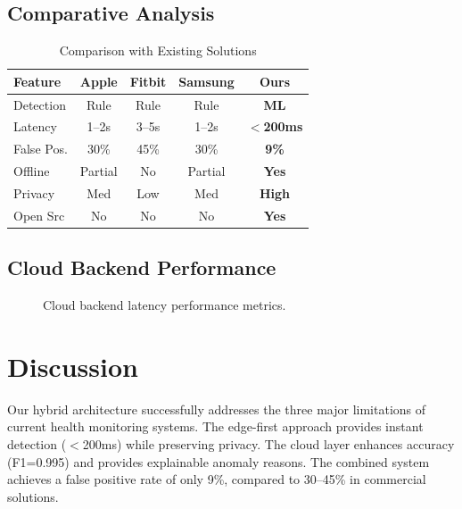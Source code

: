 \documentclass[conference]{IEEEtran}
\begin{document}
\subsection{Comparative Analysis}

\begin{table}[H]
\centering
\caption{Comparison with Existing Solutions}
\label{tab:comparison}
\begin{tabular}{lcccc}
\toprule
\textbf{Feature} & \textbf{Apple} & \textbf{Fitbit} & \textbf{Samsung} & \textbf{Ours} \\
\midrule
Detection & Rule & Rule & Rule & \textbf{ML} \\
Latency & 1--2s & 3--5s & 1--2s & \textbf{$<$200ms} \\
False Pos. & 30\% & 45\% & 30\% & \textbf{9\%} \\
Offline & Partial & No & Partial & \textbf{Yes} \\
Privacy & Med & Low & Med & \textbf{High} \\
Open Src & No & No & No & \textbf{Yes} \\
\bottomrule
\end{tabular}
\end{table}

\subsection{Cloud Backend Performance}

\begin{figure}[H]
\centering
{}
\caption{Cloud backend latency performance metrics.}
\label{fig:cloud_latency}
\end{figure}

\section{Discussion}
Our hybrid architecture successfully addresses the three major limitations of current health monitoring systems. The edge-first approach provides instant detection ($<$200ms) while preserving privacy. The cloud layer enhances accuracy (F1=0.995) and provides explainable anomaly reasons. The combined system achieves a false positive rate of only 9\%, compared to 30--45\% in commercial solutions.
\end{document}
